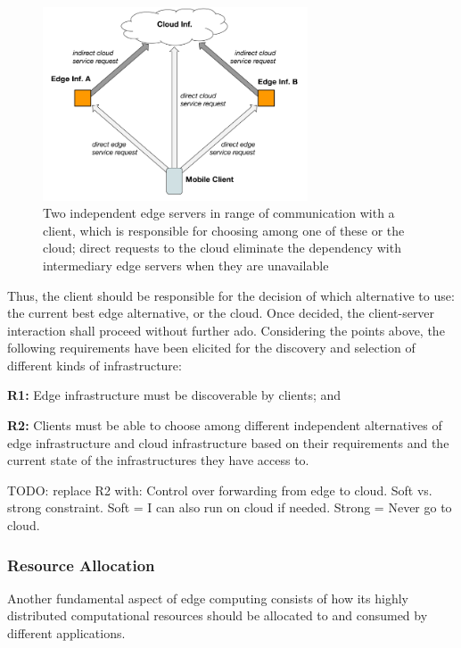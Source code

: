 \begin{figure}
  \includegraphics[width=0.7\textwidth]{figs/domain-selection.png}
  \caption{Two independent edge servers in range of communication with a client, which is responsible for choosing among one of these or the cloud; direct requests to the cloud eliminate the dependency with intermediary edge servers when they are unavailable}
  \label{fig:domain-selection}
\end{figure}


Thus, the client should be responsible for the decision of which alternative to use: the current best edge alternative, or the cloud. Once decided, the client-server interaction shall proceed without further ado.
Considering the points above, the following requirements have been elicited for the discovery and selection of different kinds of infrastructure:

\textbf{R1:} Edge infrastructure must be discoverable by clients; and 

\textbf{R2:} Clients must be able to choose among different independent alternatives of edge infrastructure and cloud infrastructure based on their requirements and the current state of the infrastructures they have access to.

TODO: replace R2 with: Control over forwarding from edge to cloud. Soft vs. strong constraint. Soft = I can also run on cloud if needed. Strong = Never go to cloud.

\subsubsection{Resource Allocation}

Another fundamental aspect of edge computing consists of how its highly distributed computational resources should be allocated to and consumed by different applications.

